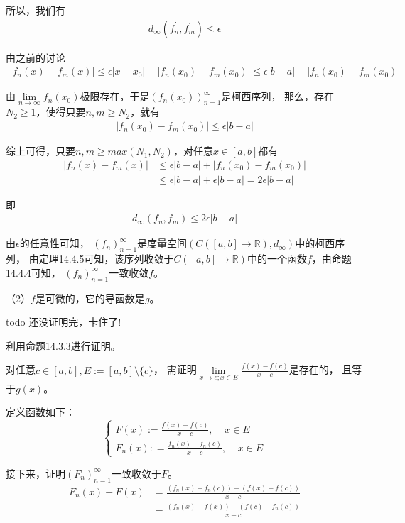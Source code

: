 \documentclass{article}
\begin{document}
所以，我们有
\begin{align*}
  d_\infty(f_n^\prime, f_m^\prime) \leq \epsilon
\end{align*}

由之前的讨论
\begin{align*}
  |f_n(x) - f_m(x)| \leq \epsilon|x - x_0| + |f_n(x_0) - f_m(x_0)| \leq \epsilon|b - a| + |f_n(x_0) - f_m(x_0)|
\end{align*}

由$\lim\limits_{n \to \infty} f_n(x_0)$极限存在，于是$(f_n(x_0))_{n = 1}^\infty$是柯西序列，
那么，存在$N_2 \geq 1$，使得只要$n, m \geq N_2$，就有
\begin{align*}
  |f_n(x_0) - f_m(x_0)| \leq \epsilon|b - a|
\end{align*}

综上可得，只要$n, m \geq max(N_1, N_2)$，对任意$x \in [a, b]$都有
\begin{align*}
  |f_n(x) - f_m(x)| & \leq \epsilon|b - a| + |f_n(x_0) - f_m(x_0)|              \\
                    & \leq \epsilon|b - a| + \epsilon|b - a| = 2\epsilon|b - a|
\end{align*}

即
\begin{align*}
  d_\infty(f_n, f_m) \leq 2\epsilon|b - a|
\end{align*}

由$\epsilon$的任意性可知，
$(f_n)_{n = 1}^\infty$是度量空间$(C([a, b] \to \mathbb{R}), d_{\infty})$中的柯西序列，
由定理14.4.5可知，该序列收敛于$C([a, b] \to \mathbb{R})$中的一个函数$f$，由命题14.4.4可知，
$(f_n)_{n = 1}^\infty$一致收敛$f$。

（2）$f$是可微的，它的导函数是$g$。

todo 还没证明完，卡住了!

利用命题14.3.3进行证明。

对任意$c \in [a, b], E := [a, b] \setminus \{c\}$，
需证明$\lim\limits_{x \to c; x \in E} \frac{f(x) - f(c)}{x - c}$是存在的，
且等于$g(x)$。

定义函数如下：
\begin{equation*}
  \begin{cases*}
    F(x)    := \frac{f(x) - f(c)}{x - c},\;\;\;\; x \in E \\
    F_n(x)  : = \frac{f_n(x) - f_n(c)}{x - c}, \;\;\;\; x \in E
  \end{cases*}
\end{equation*}

接下来，证明$(F_n)_{n = 1}^\infty$一致收敛于$F$。
\begin{align*}
  F_n(x) - F(x) & = \frac{(f_n(x) - f_n(c)) - (f(x) - f(c))}{x - c} \\
                & = \frac{(f_n(x) - f(x)) + (f(c) - f_n(c))}{x - c}
\end{align*}
\end{document}
